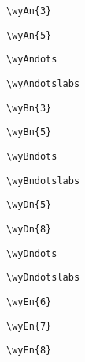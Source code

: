\documentclass[11pt,a4paper,onecolumn]{article}
\begin{document}
\verb!\wyAn{3}!	\begin{wythoff}\end{wythoff}

\verb!\wyAn{5}!	\begin{wythoff}\end{wythoff}

\verb!\wyAndots! \begin{wythoff}\wyAndots\end{wythoff}

\verb!\wyAndotslabs! \begin{wythoff}\wyAndotslabs\end{wythoff}

\verb!\wyBn{3}!	\begin{wythoff}\end{wythoff}

\verb!\wyBn{5}!	\begin{wythoff}\end{wythoff}

\verb!\wyBndots! \begin{wythoff}\wyBndots\end{wythoff}

\verb!\wyBndotslabs! \begin{wythoff}\wyBndotslabs\end{wythoff}

\verb!\wyDn{5}!	\begin{wythoff}\end{wythoff}

\verb!\wyDn{8}!	\begin{wythoff}\end{wythoff}

\verb!\wyDndots! \begin{wythoff}\wyDndots\end{wythoff}

\verb!\wyDndotslabs! \begin{wythoff}\wyDndotslabs\end{wythoff}

\verb!\wyEn{6}!	\begin{wythoff}\end{wythoff}

\verb!\wyEn{7}!	\begin{wythoff}\end{wythoff}

\verb!\wyEn{8}!	\begin{wythoff}\end{wythoff}
\end{document}
